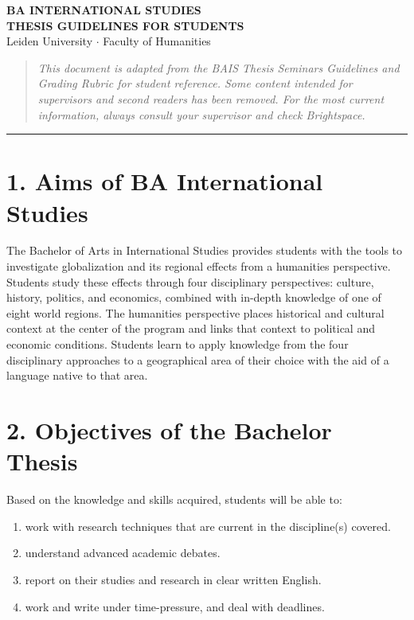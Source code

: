 \documentclass[11pt,a4paper]{article}
\begin{document}
\begin{center}
{\Large\bfseries BA INTERNATIONAL STUDIES}\\[0.3em]
{\Large\bfseries THESIS GUIDELINES FOR STUDENTS}\\[0.5em]
{\normalsize Leiden University $\cdot$ Faculty of Humanities}\\[1.5em]
\end{center}

\begin{quote}
\small\textit{This document is adapted from the BAIS Thesis Seminars Guidelines and Grading Rubric for student reference. Some content intended for supervisors and second readers has been removed. For the most current information, always consult your supervisor and check Brightspace.}
\end{quote}

\bigskip
\hrule
\bigskip

\section{1. Aims of BA International Studies}

The Bachelor of Arts in International Studies provides students with the tools to investigate globalization and its regional effects from a humanities perspective. Students study these effects through four disciplinary perspectives: culture, history, politics, and economics, combined with in-depth knowledge of one of eight world regions. The humanities perspective places historical and cultural context at the center of the program and links that context to political and economic conditions. Students learn to apply knowledge from the four disciplinary approaches to a geographical area of their choice with the aid of a language native to that area.

\section{2. Objectives of the Bachelor Thesis}

Based on the knowledge and skills acquired, students will be able to:
\begin{enumerate}[label=\alph*)]
    \item work with research techniques that are current in the discipline(s) covered.
    \item understand advanced academic debates.
    \item report on their studies and research in clear written English.
    \item work and write under time-pressure, and deal with deadlines.
\end{enumerate}
\end{document}
